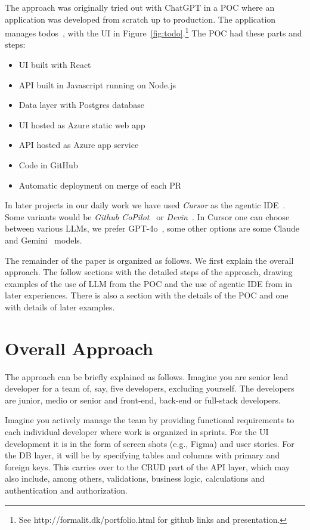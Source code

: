 \documentclass[runningheads]{llncs}
\begin{document}
\noindent The approach was originally tried out with ChatGPT in a POC where an application was developed from scratch up to production. The application manages todos~\cite{Freeman2013}, with the UI in Figure~\ref{fig:todo}.\footnote{See http://formalit.dk/portfolio.html for github links and presentation.}  The POC had these parts and steps:
\begin{itemize}
    \item UI built with React
    \item API built in Javascript running on Node.js
    \item Data layer with Postgres database
    \item UI hosted as Azure static web app
    \item API hosted as Azure app service
    \item Code in GitHub
    \item Automatic deployment on merge of each PR
\end{itemize}

\noindent In later projects in our daily work we have used {\em Cursor} as the agentic IDE~\cite{Cursor_2023}. Some variants would be {\em Github CoPilot}~\cite{GitHubCopilot_2023} or {\em Devin}~\cite{Devin_2023}. In Cursor one can choose between various LLMs, we prefer GPT-4o~\cite{GPT40_2023}, some other options are some Claude~\cite{Claude_2023} and Gemini~\cite{Gemini_2023} models.

The remainder of the paper is organized as follows. We first explain the overall approach. The follow sections with the detailed steps of the approach, drawing examples of the use of LLM from the POC and the use of agentic IDE from in later experiences.  There is also a section with the details of the POC and one with details of later examples.

\section{Overall Approach}
The approach can be briefly explained as follows. Imagine you are senior lead developer for a team of, say, five developers, excluding yourself. The developers are junior, medio or senior and front-end, back-end or full-stack developers.

Imagine you actively manage the team by providing functional requirements to each individual developer where work is organized in sprints. For the UI development it is in the form of screen shots (e.g., Figma) and user stories. For the DB layer, it will be by specifying tables and columns with primary and foreign keys. This carries over to the CRUD part of the API layer, which may also include, among others, validations, business logic, calculations and authentication and authorization.
\end{document}
